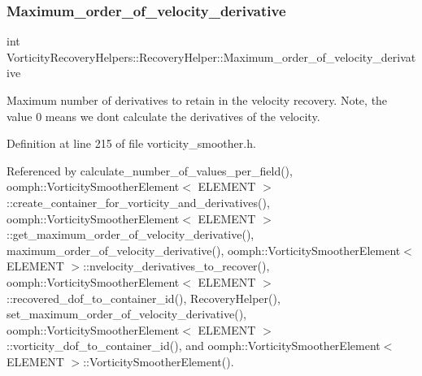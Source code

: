 \subsubsection{\texorpdfstring{Maximum\+\_\+order\+\_\+of\+\_\+velocity\+\_\+derivative}{Maximum\_order\_of\_velocity\_derivative}}
{\footnotesize\ttfamily int Vorticity\+Recovery\+Helpers\+::\+Recovery\+Helper\+::\+Maximum\+\_\+order\+\_\+of\+\_\+velocity\+\_\+derivative\hspace{0.3cm}{\ttfamily [private]}}



Maximum number of derivatives to retain in the velocity recovery. Note, the value 0 means we don\textquotesingle{}t calculate the derivatives of the velocity. 



Definition at line 215 of file vorticity\+\_\+smoother.\+h.



Referenced by calculate\+\_\+number\+\_\+of\+\_\+values\+\_\+per\+\_\+field(), oomph\+::\+Vorticity\+Smoother\+Element$<$ E\+L\+E\+M\+E\+N\+T $>$\+::create\+\_\+container\+\_\+for\+\_\+vorticity\+\_\+and\+\_\+derivatives(), oomph\+::\+Vorticity\+Smoother\+Element$<$ E\+L\+E\+M\+E\+N\+T $>$\+::get\+\_\+maximum\+\_\+order\+\_\+of\+\_\+velocity\+\_\+derivative(), maximum\+\_\+order\+\_\+of\+\_\+velocity\+\_\+derivative(), oomph\+::\+Vorticity\+Smoother\+Element$<$ E\+L\+E\+M\+E\+N\+T $>$\+::nvelocity\+\_\+derivatives\+\_\+to\+\_\+recover(), oomph\+::\+Vorticity\+Smoother\+Element$<$ E\+L\+E\+M\+E\+N\+T $>$\+::recovered\+\_\+dof\+\_\+to\+\_\+container\+\_\+id(), Recovery\+Helper(), set\+\_\+maximum\+\_\+order\+\_\+of\+\_\+velocity\+\_\+derivative(), oomph\+::\+Vorticity\+Smoother\+Element$<$ E\+L\+E\+M\+E\+N\+T $>$\+::vorticity\+\_\+dof\+\_\+to\+\_\+container\+\_\+id(), and oomph\+::\+Vorticity\+Smoother\+Element$<$ E\+L\+E\+M\+E\+N\+T $>$\+::\+Vorticity\+Smoother\+Element().

\mbox{\label{classVorticityRecoveryHelpers_1_1RecoveryHelper_acbaab5c7bbd994bb001a9a1afec9b8f7}} 
